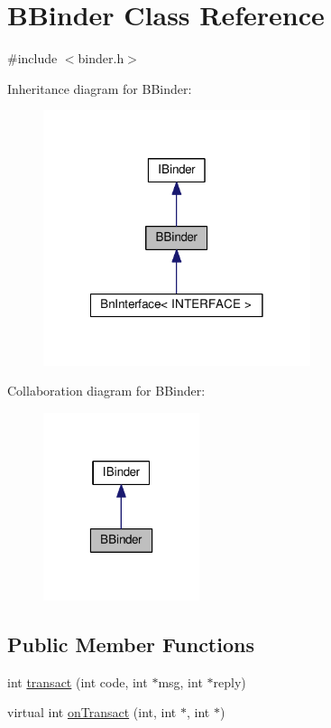 \hypertarget{classBBinder}{\section{B\-Binder Class Reference}
\label{classBBinder}
}


{\ttfamily \#include $<$binder.\-h$>$}



Inheritance diagram for B\-Binder\-:
\nopagebreak
\begin{figure}[H]
\begin{center}
\leavevmode
\includegraphics[width=222pt]{classBBinder__inherit__graph}
\end{center}
\end{figure}


Collaboration diagram for B\-Binder\-:
\nopagebreak
\begin{figure}[H]
\begin{center}
\leavevmode
\includegraphics[width=130pt]{classBBinder__coll__graph}
\end{center}
\end{figure}
\subsection*{Public Member Functions}
\begin{DoxyCompactItemize}
\item 
int \hyperlink{classBBinder_a3017278da0f18ac1280f328ac1cab221}{transact} (int code, int $\ast$msg, int $\ast$reply)
\item 
virtual int \hyperlink{classBBinder_addc75a03848c5555aff5a45f08f86898}{on\-Transact} (int, int $\ast$, int $\ast$)
\end{DoxyCompactItemize}


